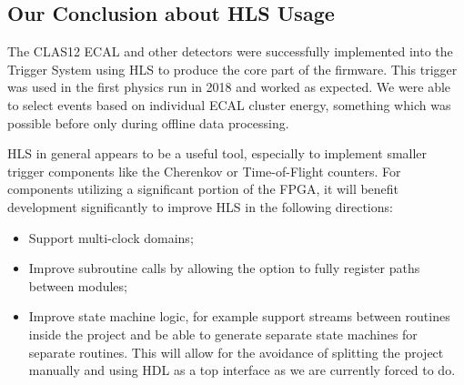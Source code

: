 \subsection{Our Conclusion about HLS Usage}

The CLAS12 ECAL and other detectors were successfully implemented into the Trigger System using HLS to produce the core part of the firmware. This trigger was used in the first physics run in 2018 and worked as expected. We were able to select events based on individual ECAL cluster energy, something which was possible before only during offline data processing.

HLS in general appears to be a useful tool, especially to implement smaller trigger components like the Cherenkov or Time-of-Flight counters. For components utilizing a significant portion of the FPGA, it will benefit development significantly to improve HLS in the following directions:

\begin{itemize}
	\item Support multi-clock domains;
	\item Improve subroutine calls by allowing the option to fully register paths between modules; 
	\item Improve state machine logic, for example support streams between routines inside the project and be able to generate separate state machines for separate routines. This will allow for the avoidance of splitting the project manually and using HDL as a top interface as we are currently forced to do.
\end{itemize}
